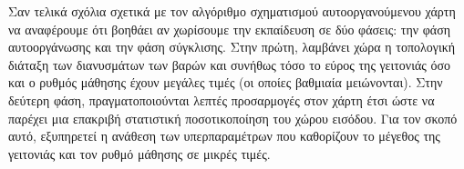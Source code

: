Σαν τελικά σχόλια σχετικά με τον αλγόριθμο σχηματισμού αυτο\textendash οργανούμενου χάρτη να αναφέρουμε ότι βοηθάει αν χωρίσουμε την εκπαίδευση σε δύο φάσεις: την φάση αυτο\textendash οργάνωσης και την φάση σύγκλισης. Στην πρώτη, λαμβάνει χώρα η τοπολογική διάταξη των διανυσμάτων των βαρών και συνήθως τόσο το εύρος της γειτονιάς όσο και ο ρυθμός μάθησης έχουν μεγάλες τιμές (οι οποίες βαθμιαία μειώνονται). Στην δεύτερη φάση, πραγματοποιούνται λεπτές προσαρμογές στον χάρτη έτσι ώστε να παρέχει μια επακριβή στατιστική ποσοτικοποίηση του χώρου εισόδου\cite{haykin2009neural}. Για τον σκοπό αυτό, εξυπηρετεί η ανάθεση των υπερπαραμέτρων που καθορίζουν το μέγεθος της γειτονιάς και τον ρυθμό μάθησης σε μικρές τιμές.


